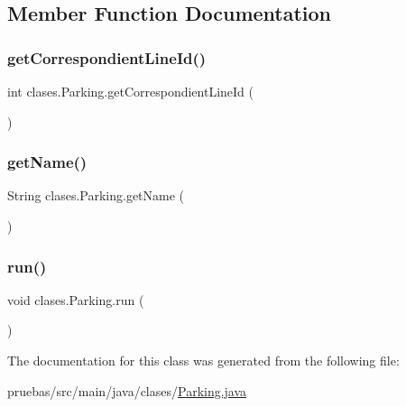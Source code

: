 \subsection{Member Function Documentation}
\mbox{\label{classclases_1_1_parking_a03f52670aae58fe1af947e75cc8ca318}} 
\subsubsection{\texorpdfstring{get\+Correspondient\+Line\+Id()}{getCorrespondientLineId()}}
{\footnotesize\ttfamily int clases.\+Parking.\+get\+Correspondient\+Line\+Id (\begin{DoxyParamCaption}{ }\end{DoxyParamCaption})}

\mbox{\label{classclases_1_1_parking_adcdc236dec3311a9830a411a3cbbc448}} 
\subsubsection{\texorpdfstring{get\+Name()}{getName()}}
{\footnotesize\ttfamily String clases.\+Parking.\+get\+Name (\begin{DoxyParamCaption}{ }\end{DoxyParamCaption})}

\mbox{\label{classclases_1_1_parking_a6caa7f58e50c46346ae1233f1988c84d}} 
\subsubsection{\texorpdfstring{run()}{run()}}
{\footnotesize\ttfamily void clases.\+Parking.\+run (\begin{DoxyParamCaption}{ }\end{DoxyParamCaption})}



The documentation for this class was generated from the following file\+:\begin{DoxyCompactItemize}
\item 
pruebas/src/main/java/clases/\mbox{\hyperlink{_parking_8java}{Parking.\+java}}\end{DoxyCompactItemize}
